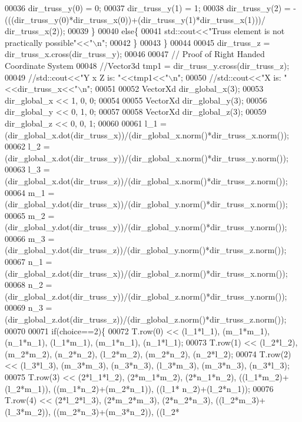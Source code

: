 \begin{DoxyCode}
00036             dir\_truss\_y(0) = 0;
00037             dir\_truss\_y(1) = 1;
00038             dir\_truss\_y(2) = -(((dir\_truss\_y(0)*dir\_truss\_x(0))+(dir\_truss\_y(1)*dir\_truss\_x(1)))/
      dir\_truss\_x(2)); 
00039         \}
00040         \textcolor{keywordflow}{else}\{
00041             std::cout<<\textcolor{stringliteral}{"Truss element is not practically possible"}<<\textcolor{stringliteral}{"\(\backslash\)n"};
00042         \}
00043     \}
00044     
00045     dir\_truss\_z = dir\_truss\_x.cross(dir\_truss\_y);
00046 
00047     \textcolor{comment}{// Proof of Right Handed Coordinate System}
00048     \textcolor{comment}{//Vector3d tmp1 = dir\_truss\_y.cross(dir\_truss\_z);}
00049     \textcolor{comment}{//std::cout<<"Y x Z is: "<<tmp1<<"\(\backslash\)n";}
00050     \textcolor{comment}{//std::cout<<"X is: "<<dir\_truss\_x<<"\(\backslash\)n";}
00051 
00052     VectorXd dir\_global\_x(3);
00053     dir\_global\_x << 1, 0, 0;
00054     
00055     VectorXd dir\_global\_y(3);
00056     dir\_global\_y << 0, 1, 0;
00057 
00058     VectorXd dir\_global\_z(3);
00059     dir\_global\_z << 0, 0, 1;
00060 
00061     l\_1 = (dir\_global\_x.dot(dir\_truss\_x))/(dir\_global\_x.norm()*dir\_truss\_x.norm());
00062     l\_2 = (dir\_global\_x.dot(dir\_truss\_y))/(dir\_global\_x.norm()*dir\_truss\_y.norm());
00063     l\_3 = (dir\_global\_x.dot(dir\_truss\_z))/(dir\_global\_x.norm()*dir\_truss\_z.norm()); 
00064     m\_1 = (dir\_global\_y.dot(dir\_truss\_x))/(dir\_global\_y.norm()*dir\_truss\_x.norm()); 
00065     m\_2 = (dir\_global\_y.dot(dir\_truss\_y))/(dir\_global\_y.norm()*dir\_truss\_y.norm());
00066     m\_3 = (dir\_global\_y.dot(dir\_truss\_z))/(dir\_global\_y.norm()*dir\_truss\_z.norm());
00067     n\_1 = (dir\_global\_z.dot(dir\_truss\_x))/(dir\_global\_z.norm()*dir\_truss\_x.norm());
00068     n\_2 = (dir\_global\_z.dot(dir\_truss\_y))/(dir\_global\_z.norm()*dir\_truss\_y.norm());
00069     n\_3 = (dir\_global\_z.dot(dir\_truss\_z))/(dir\_global\_z.norm()*dir\_truss\_z.norm());
00070 
00071     \textcolor{keywordflow}{if}(choice==2)\{
00072     T.row(0) << (l\_1*l\_1), (m\_1*m\_1), (n\_1*n\_1), (l\_1*m\_1), (m\_1*n\_1), (n\_1*l\_1);
00073     T.row(1) << (l\_2*l\_2), (m\_2*m\_2), (n\_2*n\_2), (l\_2*m\_2), (m\_2*n\_2), (n\_2*l\_2);
00074     T.row(2) << (l\_3*l\_3), (m\_3*m\_3), (n\_3*n\_3), (l\_3*m\_3), (m\_3*n\_3), (n\_3*l\_3);
00075     T.row(3) << (2*l\_1*l\_2), (2*m\_1*m\_2), (2*n\_1*n\_2), ((l\_1*m\_2)+(l\_2*m\_1)), ((m\_1*n\_2)+(m\_2*n\_1)), ((l\_1*
      n\_2)+(l\_2*n\_1));
00076     T.row(4) << (2*l\_2*l\_3), (2*m\_2*m\_3), (2*n\_2*n\_3), ((l\_2*m\_3)+(l\_3*m\_2)), ((m\_2*n\_3)+(m\_3*n\_2)), ((l\_2*

\end{DoxyCode}
